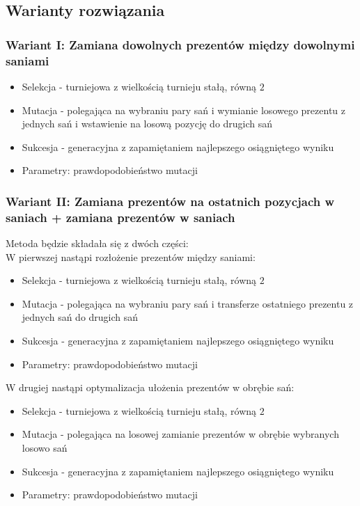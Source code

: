 \documentclass[titlepage]{article}
\begin{document}
        \subsection{
            Warianty rozwiązania
        }
            \subsubsection{
                Wariant I: Zamiana dowolnych prezentów między dowolnymi saniami
            }
                \begin{itemize}
                    \item Selekcja - turniejowa z wielkością turnieju stałą, równą $2$
                    \item Mutacja - polegająca na wybraniu pary sań i wymianie losowego prezentu z jednych sań i wstawienie na losową pozycję do drugich sań
                    \item Sukcesja - generacyjna z zapamiętaniem najlepszego osiągniętego wyniku
                    \item Parametry: prawdopodobieństwo mutacji
                \end{itemize}

            \subsubsection{
                Wariant II: Zamiana prezentów na ostatnich pozycjach w saniach + zamiana prezentów w saniach
            }
                Metoda będzie składała się z dwóch części: \\

                \noindent W pierwszej nastąpi rozłożenie prezentów między saniami:
                \begin{itemize}
                    \item Selekcja - turniejowa z wielkością turnieju stałą, równą $2$
                    \item Mutacja - polegająca na wybraniu pary sań i transferze ostatniego prezentu z jednych sań do drugich sań
                    \item Sukcesja - generacyjna z zapamiętaniem najlepszego osiągniętego wyniku
                    \item Parametry: prawdopodobieństwo mutacji
                \end{itemize}

                \noindent W drugiej nastąpi optymalizacja ułożenia prezentów w obrębie sań:
                \begin{itemize}
                    \item Selekcja - turniejowa z wielkością turnieju stałą, równą $2$
                    \item Mutacja - polegająca na losowej zamianie prezentów w obrębie wybranych losowo sań
                    \item Sukcesja - generacyjna z zapamiętaniem najlepszego osiągniętego wyniku
                    \item Parametry: prawdopodobieństwo mutacji 
                \end{itemize}
\end{document}
